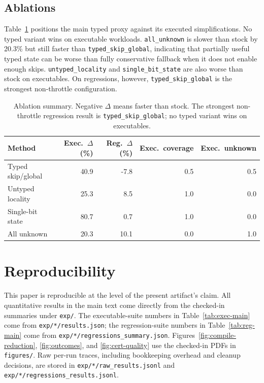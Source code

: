 \documentclass{article}
\begin{document}
\subsection{Ablations}

Table~\ref{tab:ablations} positions the main typed proxy against its executed simplifications. No typed variant wins on executable workloads. \texttt{all\_unknown} is slower than stock by 20.3\% but still faster than \texttt{typed\_skip\_global}, indicating that partially useful typed state can be worse than fully conservative fallback when it does not enable enough skips. \texttt{untyped\_locality} and \texttt{single\_bit\_state} are also worse than stock on executables. On regressions, however, \texttt{typed\_skip\_global} is the strongest non-throttle configuration.

\begin{table}[t]
\caption{Ablation summary. Negative $\Delta$ means faster than stock. The strongest non-throttle regression result is \texttt{typed\_skip\_global}; no typed variant wins on executables.}
\label{tab:ablations}
\centering
\small
\begin{tabular}{lrrrr}
\toprule
Method & Exec.\ $\Delta$ (\%) & Reg.\ $\Delta$ (\%) & Exec.\ coverage & Exec.\ unknown \\
\midrule
Typed skip/global & 40.9 & -7.8 & 0.5 & 0.5 \\
Untyped locality & 25.3 & 8.5 & 1.0 & 0.0 \\
Single-bit state & 80.7 & 0.7 & 1.0 & 0.0 \\
All unknown & 20.3 & 10.1 & 0.0 & 1.0 \\
\bottomrule
\end{tabular}
\end{table}

\section{Reproducibility}
\label{sec:repro}

This paper is reproducible at the level of the present artifact's claim. All quantitative results in the main text come directly from the checked-in summaries under \texttt{exp/}. The executable-suite numbers in Table~\ref{tab:exec-main} come from \texttt{exp/*/results.json}; the regression-suite numbers in Table~\ref{tab:reg-main} come from \texttt{exp/*/regressions\_summary.json}. Figures~\ref{fig:compile-reduction}, \ref{fig:outcomes}, and \ref{fig:cert-quality} use the checked-in PDFs in \texttt{figures/}. Raw per-run traces, including bookkeeping overhead and cleanup decisions, are stored in \texttt{exp/*/raw\_results.jsonl} and \texttt{exp/*/regressions\_results.jsonl}.
\end{document}
